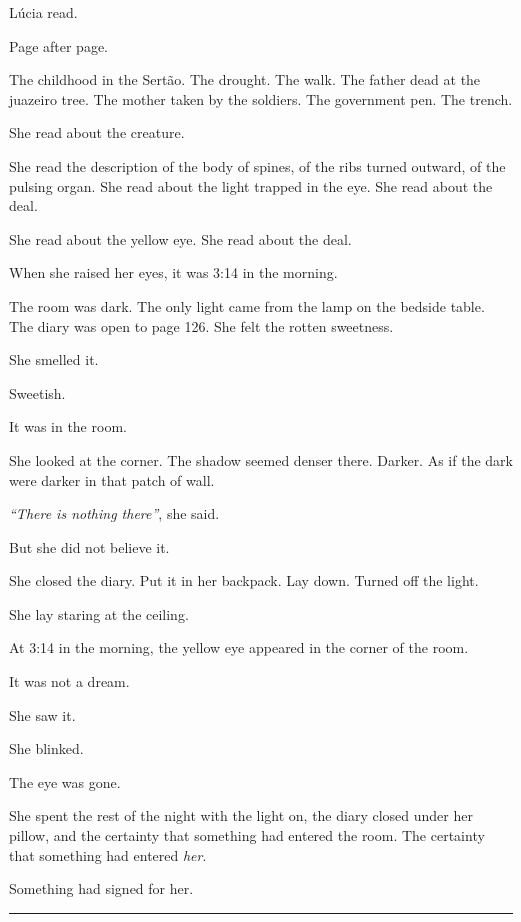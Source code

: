 \noindent Lúcia read.

\noindent Page after page.

\noindent The childhood in the Sertão. The drought. The walk. The father dead at the juazeiro tree. The mother taken by the soldiers. The government pen. The trench.

\noindent She read about the creature.

\noindent She read the description of the body of spines, of the ribs turned outward, of the pulsing organ. She read about the light trapped in the eye. She read about the deal.

\noindent She read about the yellow eye. She read about the deal.

\noindent When she raised her eyes, it was 3:14 in the morning.

\noindent The room was dark. The only light came from the lamp on the bedside table. The diary was open to page 126.
\noindent She felt the rotten sweetness.

\noindent She smelled it.

\noindent Sweetish.

\noindent It was in the room.

\noindent She looked at the corner. The shadow seemed denser there. Darker. As if the dark were darker in that patch of wall.

\noindent \textit{\textquotedblleft{}There is nothing there\textquotedblright{}}, she said.

\noindent But she did not believe it.

\noindent She closed the diary. Put it in her backpack. Lay down. Turned off the light.

\noindent She lay staring at the ceiling.

\noindent At 3:14 in the morning, the yellow eye appeared in the corner of the room.

\noindent It was not a dream.

\noindent She saw it.

\noindent She blinked.

\noindent The eye was gone.

\noindent She spent the rest of the night with the light on, the diary closed under her pillow, and the certainty that something had entered the room.
\noindent The certainty that something had entered \textit{her}.

\noindent Something had signed for her.

\vspace{0.5em}\noindent\rule{\textwidth}{0.5pt}\vspace{0.5em}

